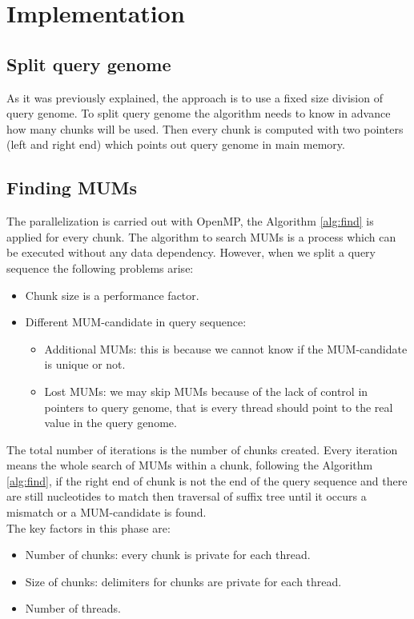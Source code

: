 \documentclass[3p,times]{elsarticle}
\begin{document}
\section{Implementation} 
\label{implementation}
\subsection*{Split query genome}  
As it was previously explained, the approach is to use a fixed size division of query genome. To split query genome the algorithm needs to know in advance how many chunks will be used. Then every chunk is computed with two pointers (left and right end) which points out query genome in main memory.
\subsection*{Finding MUMs}
The parallelization is carried out with OpenMP, the Algorithm \ref{alg:find} is applied for every chunk. The algorithm to search MUMs is a process which can be executed without any data dependency. However, when we split a query sequence the following problems arise:
\begin{itemize}
  \item Chunk size is a performance factor.
  \item Different MUM-candidate in query sequence:
    \begin{itemize}
      \item Additional MUMs: this is because we cannot know if the MUM-candidate is unique or not.
      \item Lost MUMs: we may skip MUMs because of the lack of control in pointers to query genome, that is every thread should point to the real value in the query genome.
    \end{itemize}
\end{itemize}
The total number of iterations is the number of chunks created. Every iteration means the whole search of MUMs within a chunk, following the Algorithm \ref{alg:find}, if the right end of chunk is not the end of the query sequence and there are still nucleotides to match then traversal of suffix tree until it occurs a mismatch or a MUM-candidate is found.\\
The key factors in this phase are:
\begin{itemize}
  \item Number of chunks: every chunk is private for each thread.
  \item Size of chunks: delimiters for chunks are private for each thread.
  \item Number of threads.
\end{itemize}
\end{document}
